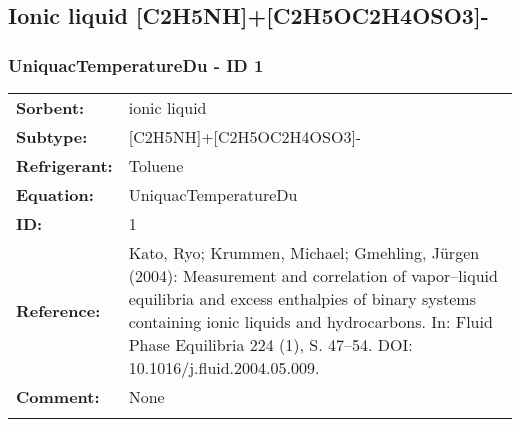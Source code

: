 \subsection{Ionic liquid [C2H5NH]+[C2H5OC2H4OSO3]-}
%
\subsubsection{UniquacTemperatureDu - ID 1}
%
\begin{tabular}[l]{|lp{11.5cm}|}
\hline
\addlinespace

\textbf{Sorbent:} & ionic liquid \\
\textbf{Subtype:} & [C2H5NH]+[C2H5OC2H4OSO3]- \\
\textbf{Refrigerant:} & Toluene \\
\textbf{Equation:} & UniquacTemperatureDu \\
\textbf{ID:} & 1 \\
\textbf{Reference:} & Kato, Ryo; Krummen, Michael; Gmehling, Jürgen (2004): Measurement and correlation of vapor–liquid equilibria and excess enthalpies of binary systems containing ionic liquids and hydrocarbons. In: Fluid Phase Equilibria 224 (1), S. 47–54. DOI: 10.1016/j.fluid.2004.05.009. \\
\textbf{Comment:} & None \\

\addlinespace
\hline
\end{tabular}
\newline


